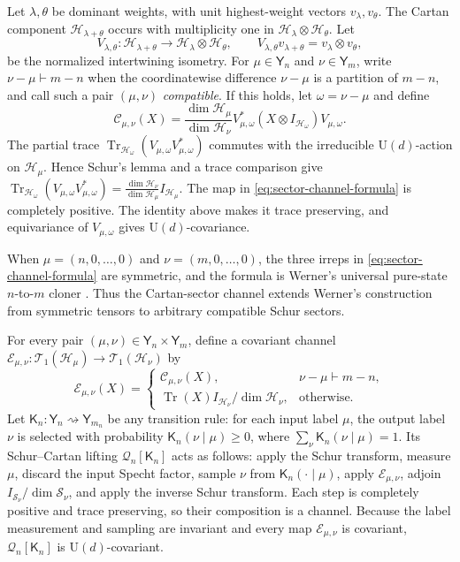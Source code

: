 \documentclass[11pt]{article}
\theoremstyle{remark}
\theoremstyle{plain}
\newcommand{\cC}{\mathcal C}
\newcommand{\cE}{\mathcal E}
\newcommand{\cH}{\mathcal H}
\newcommand{\cS}{\mathcal S}
\newcommand{\cT}{\mathcal T}
\newcommand{\U}{\mathrm U}
\newcommand{\Tr}{\operatorname{Tr}}
\newcommand{\ot}{\otimes}
\begin{document}
Let \(\lambda,\theta\) be dominant weights, with unit highest-weight vectors
\(v_\lambda,v_\theta\).  The Cartan component \(\cH_{\lambda+\theta}\)
occurs with multiplicity one in \(\cH_\lambda\ot\cH_\theta\).  Let
\begin{equation}\label{eq:cartan-inclusion}
  V_{\lambda,\theta}:\cH_{\lambda+\theta}
  \longrightarrow\cH_\lambda\ot\cH_\theta,
  \qquad
  V_{\lambda,\theta}v_{\lambda+\theta}=v_\lambda\ot v_\theta,
\end{equation}
be the normalized intertwining isometry.  For \(\mu\in\mathsf Y_n\) and
\(\nu\in\mathsf Y_m\), write \(\nu-\mu\vdash m-n\) when the coordinatewise
difference \(\nu-\mu\) is a partition of \(m-n\), and call such a pair
\((\mu,\nu)\) \emph{compatible}.  If this holds, let
\(\omega=\nu-\mu\) and define
\begin{equation}\label{eq:sector-channel-formula}
  \cC_{\mu,\nu}(X)
  =\frac{\dim\cH_\mu}{\dim\cH_\nu}
  V_{\mu,\omega}^*(X\ot I_{\cH_\omega})V_{\mu,\omega}.
\end{equation}
The partial trace
\(\Tr_{\cH_\omega}(V_{\mu,\omega}V_{\mu,\omega}^*)\) commutes with the
irreducible \(\U(d)\)-action on \(\cH_\mu\).  Hence Schur's lemma and a trace
comparison give
\(
  \Tr_{\cH_\omega}(V_{\mu,\omega}V_{\mu,\omega}^*)
  =\frac{\dim\cH_\nu}{\dim\cH_\mu}I_{\cH_\mu}
\).
The map in \eqref{eq:sector-channel-formula} is completely positive.
The identity above makes it trace preserving, and equivariance of
\(V_{\mu,\omega}\) gives \(\U(d)\)-covariance.

When \(\mu=(n,0,\ldots,0)\) and \(\nu=(m,0,\ldots,0)\), the three
irreps in \eqref{eq:sector-channel-formula} are symmetric,
and the formula is Werner's universal pure-state \(n\)-to-\(m\) cloner
\cite{Werner1998}.  Thus the Cartan-sector channel extends Werner's
construction from symmetric tensors to arbitrary compatible Schur sectors.

For every pair \((\mu,\nu)\in\mathsf Y_n\times\mathsf Y_m\), define a
covariant channel \(\cE_{\mu,\nu}:\cT_1(\cH_\mu)\to\cT_1(\cH_\nu)\) by
\begin{equation}\label{eq:sector-channel-extension}
  \cE_{\mu,\nu}(X)=
  \begin{cases}
    \cC_{\mu,\nu}(X),&\nu-\mu\vdash m-n,\\[1mm]
    \Tr(X)I_{\cH_\nu}/\dim\cH_\nu,&\text{otherwise}.
  \end{cases}
\end{equation}
Let \(\mathsf K_n:\mathsf Y_n\rightsquigarrow\mathsf Y_{m_n}\) be any transition
rule: for each input label \(\mu\), the output label \(\nu\) is selected
with probability \(\mathsf K_n(\nu\mid\mu)\ge0\), where
\(\sum_\nu \mathsf K_n(\nu\mid\mu)=1\).  Its Schur--Cartan
lifting \(\mathcal Q_n[\mathsf K_n]\) acts as follows: apply the Schur transform, measure
\(\mu\), discard the input Specht factor, sample \(\nu\) from
\(\mathsf K_n(\cdot\mid\mu)\), apply \(\cE_{\mu,\nu}\), adjoin
\(I_{\cS_\nu}/\dim\cS_\nu\), and apply the inverse Schur transform.  Each
step is completely positive and trace preserving, so their composition is a
channel.  Because the label measurement and sampling are invariant and every
map \(\cE_{\mu,\nu}\) is covariant, \(\mathcal Q_n[\mathsf K_n]\) is
\(\U(d)\)-covariant.
\end{document}
